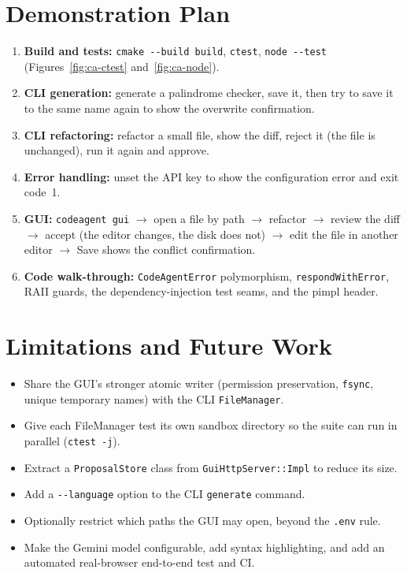 \documentclass[12pt,a4paper,oneside]{book}
\begin{document}
\section{Demonstration Plan}
\label{sec:ca-demo}
\begin{enumerate}
  \item \textbf{Build and tests:} \texttt{cmake -{}-build build},
    \texttt{ctest}, \texttt{node -{}-test} (Figures~\ref{fig:ca-ctest}
    and~\ref{fig:ca-node}).
  \item \textbf{CLI generation:} generate a palindrome checker, save it, then
    try to save it to the same name again to show the overwrite
    confirmation.
  \item \textbf{CLI refactoring:} refactor a small file, show the diff, reject
    it (the file is unchanged), run it again and approve.
  \item \textbf{Error handling:} unset the API key to show the configuration
    error and exit code~1.
  \item \textbf{GUI:} \texttt{codeagent gui} $\rightarrow$ open a file by
    path $\rightarrow$ refactor $\rightarrow$ review the diff $\rightarrow$
    accept (the editor changes, the disk does not) $\rightarrow$ edit the
    file in another editor $\rightarrow$ Save shows the conflict
    confirmation.
  \item \textbf{Code walk-through:} \texttt{CodeAgentError} polymorphism,
    \texttt{respondWithError}, RAII guards, the dependency-injection test
    seams, and the pimpl header.
\end{enumerate}

\section{Limitations and Future Work}
\begin{itemize}
  \item Share the GUI's stronger atomic writer (permission preservation,
    \texttt{fsync}, unique temporary names) with the CLI
    \texttt{FileManager}.
  \item Give each FileManager test its own sandbox directory so the suite can
    run in parallel (\texttt{ctest -j}).
  \item Extract a \texttt{ProposalStore} class from
    \texttt{GuiHttpServer::\allowbreak{}Impl} to reduce its size.
  \item Add a \texttt{-{}-language} option to the CLI \texttt{generate}
    command.
  \item Optionally restrict which paths the GUI may open, beyond the
    \texttt{.env} rule.
  \item Make the Gemini model configurable, add syntax highlighting, and add
    an automated real-browser end-to-end test and CI.
\end{itemize}
\end{document}
